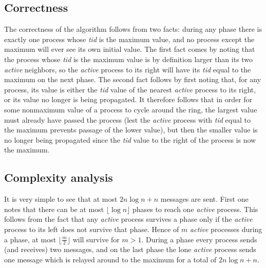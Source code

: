 \documentclass{article}
\begin{document}
\subsection*{Correctness}
The correctness of the algorithm follows from two facts: during any phase there is exactly one process whose \textit{tid} is the maximum value, and no process except the maximum will ever see its own initial value. The first fact comes by noting that the process whose \textit{tid} is the maximum value is by definition larger than its two \textit{active} neighbors, so the \textit{active} process to its right will have its \textit{tid} equal to the maximum on the next phase. The second fact follows by first noting that, for any process, its value is either the \textit{tid} value of the nearest \textit{active} process to its right, or its value no longer is being propagated. It therefore follows that in order for some nonmaximum value of a process to cycle around the ring, the largest value must already have passed the process (lest the \textit{active} process with \textit{tid} equal to the maximum prevents passage of the lower value), but then the smaller value is no longer being propagated since the \textit{tid} value to the right of the process is now the maximum.
\subsection*{Complexity analysis}
It is very simple to see that at most $2n \log n + n$ messages are sent. First one
notes that there can be at most $\lfloor\log n\rfloor$ phases to reach one \textit{active} process. This follows from the fact that any \textit{active} process survives a phase only if the \textit{active} process to its left does not survive that phase. Hence of $m$ \textit{active} processes during a phase, at most $\lfloor\frac{m}{2}\rfloor$ will survive for $m > 1$. During a phase every process sends (and receives) two messages, and on the last phase the lone \textit{active} process sends one message which is relayed around to the maximum for a total of $2n \log n + n$.

 
\end{document}
